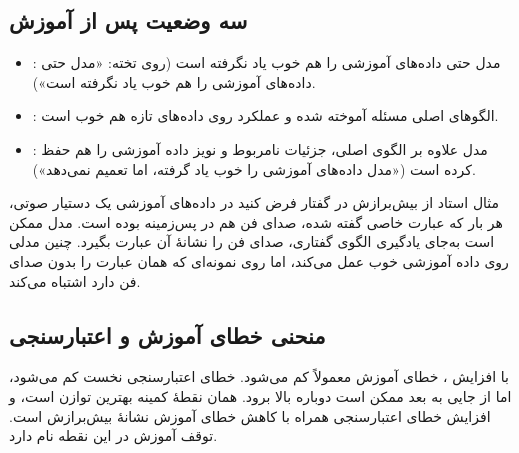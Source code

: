 \subsection{سه وضعیت پس از آموزش}
\begin{itemize}
  \item {}: مدل حتی داده‌های آموزشی را هم خوب یاد نگرفته است (روی تخته: «مدل حتی داده‌های آموزشی را هم خوب یاد نگرفته است»).
  \item {}: الگوهای اصلی مسئله آموخته شده و عملکرد روی داده‌های تازه هم خوب است.
  \item {}: مدل علاوه بر الگوی اصلی، جزئیات نامربوط و نویز داده آموزشی را هم حفظ کرده است («مدل داده‌های آموزشی را خوب یاد گرفته، اما تعمیم نمی‌دهد»).
\end{itemize}


\begin{exambox}{مثال استاد از بیش‌برازش در گفتار}
فرض کنید در داده‌های آموزشی یک دستیار صوتی، هر بار که عبارت خاصی گفته شده، صدای فن هم در پس‌زمینه بوده است. مدل ممکن است به‌جای یادگیری الگوی گفتاری، صدای فن را نشانهٔ آن عبارت بگیرد. چنین مدلی روی داده آموزشی خوب عمل می‌کند، اما روی نمونه‌ای که همان عبارت را بدون صدای فن دارد اشتباه می‌کند.
\end{exambox}

\subsection{منحنی خطای آموزش و اعتبارسنجی}
با افزایش ، خطای آموزش معمولاً کم می‌شود. خطای اعتبارسنجی نخست کم می‌شود، اما از جایی به بعد ممکن است دوباره بالا برود. همان نقطهٔ کمینه بهترین توازن است، و افزایش خطای اعتبارسنجی همراه با کاهش خطای آموزش نشانهٔ بیش‌برازش است. توقف آموزش در این نقطه  نام دارد.



